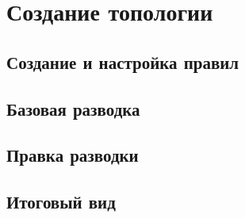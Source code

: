 \chapter{Создание топологии}


\section{Создание и настройка правил}


\section{Базовая разводка}


\section{Правка разводки}


\section{Итоговый вид}


